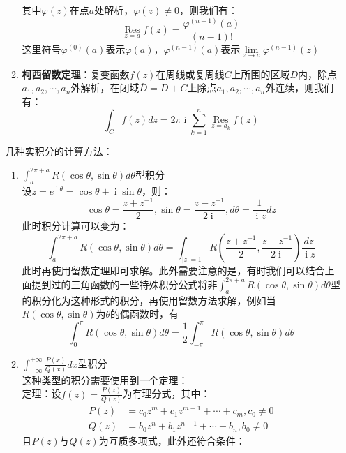 \documentclass[12pt,a4paper,UTF8]{book}
\begin{document}
\begin{enumerate}
\begin{enumerate}
其中$\varphi\left(z\right)$在点$a$处解析，$\varphi\left(z\right)\ne0$，则我们有：
\[\mathop{\operatorname{Res}}\limits_{z=a}f\left(z\right)=\frac{\varphi^{\left(n-1\right)}\left(a\right)}{\left(n-1\right)!}\]
这里符号$\varphi^{\left(0\right)}\left(a\right)$表示$\varphi\left(a\right)$，$\varphi^{\left(n-1\right)}\left(a\right)$表示$\lim\limits_{z\to a}\varphi^{\left(n-1\right)}\left(z\right)$\\
\item \textbf{柯西留数定理}：复变函数$f\left(z\right)$在周线或复周线$C$上所围的区域$D$内，除点$a_1,a_2,\cdots,a_n$外解析，在闭域$\bar{D}=D+C$上除点$a_1,a_2,\cdots,a_n$外连续，则我们有：
\[\int_{C}f\left(z\right)dz=2\pi\operatorname{i}\sum\limits_{k=1}^{n}\mathop{\operatorname{Res}}\limits_{z=a_k}f\left(z\right)\]
\end{enumerate}
几种实积分的计算方法：
\begin{enumerate}
\item $\int_{a}^{2\pi+a}R\left(\cos\theta,\sin\theta\right)d\theta$型积分\\
设$z=e^{\operatorname{i}\theta}=\cos\theta+\operatorname{i}\sin\theta$，则：
\[\cos\theta=\frac{z+z^{-1}}{2},\sin\theta=\frac{z-z^{-1}}{2\operatorname{i}},d\theta=\frac{1}{\operatorname{i}z}dz\]
此时积分计算可以变为：
\[\int_{a}^{2\pi+a}R\left(\cos\theta,\sin\theta\right)d\theta=\int_{\left|z\right|=1}R\left(\frac{z+z^{-1}}{2},\frac{z-z^{-1}}{2\operatorname{i}}\right)\frac{dz}{\operatorname{i}z}\]
此时再使用留数定理即可求解。此外需要注意的是，有时我们可以结合上面提到过的三角函数的一些特殊积分公式将非$\int_{a}^{2\pi+a}R\left(\cos\theta,\sin\theta\right)d\theta$型的积分化为这种形式的积分，再使用留数方法求解，例如当$R\left(\cos\theta,\sin\theta\right)$为$\theta$的偶函数时，有
\[\int_{0}^{\pi}R\left(\cos\theta,\sin\theta\right)d\theta=\frac{1}{2}\int_{-\pi}^{\pi}R\left(\cos\theta,\sin\theta\right)d\theta\]
\item $\int_{-\infty}^{+\infty}\frac{P\left(x\right)}{Q\left(x\right)}dx$型积分\\
这种类型的积分需要使用到一个定理：\\
定理：设$f\left(z\right)=\frac{P\left(z\right)}{Q\left(z\right)}$为有理分式，其中：
\[\begin{aligned}
P\left(z\right)&=c_0z^m+c_1z^{m-1}+\cdots+c_m,c_0\ne0\\
Q\left(z\right)&=b_0z^n+b_1z^{n-1}+\cdots+b_n,b_0\ne0
\end{aligned}\]
且$P\left(z\right)$与$Q\left(z\right)$为互质多项式，此外还符合条件：
\begin{enumerate}

\end{enumerate}
\end{enumerate}
\end{enumerate}
\end{document}
